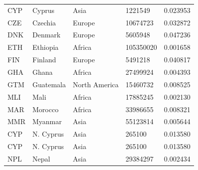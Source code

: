 \documentclass[11pt]{report}
\begin{document}
\begin{table}[]
\begin{tabular}{lllll}
            CYP                           & Cyprus                    & Asia                           & 1221549                       & 0.023953                           \\
            CZE                           & Czechia                   & Europe                         & 10674723                      & 0.032872                           \\
            DNK                           & Denmark                   & Europe                         & 5605948                       & 0.047236                           \\
            ETH                           & Ethiopia                  & Africa                         & 105350020                     & 0.001658                           \\
            FIN                           & Finland                   & Europe                         & 5491218                       & 0.040817                           \\
            GHA                           & Ghana                     & Africa                         & 27499924                      & 0.004393                           \\
            GTM                           & Guatemala                 & North America                  & 15460732                      & 0.008525                           \\
            MLI                           & Mali                      & Africa                         & 17885245                      & 0.002130                           \\
            MAR                           & Morocco                   & Africa                         & 33986655                      & 0.008321                           \\
            MMR                           & Myanmar                   & Asia                           & 55123814                      & 0.005644                           \\
            CYP                           & N. Cyprus                 & Asia                           & 265100                        & 0.013580                           \\
            CYP                           & N. Cyprus                 & Asia                           & 265100                        & 0.013580                           \\
            NPL                           & Nepal                     & Asia                           & 29384297                      & 0.002434                           \\

\end{tabular}
\end{table}
\end{document}
